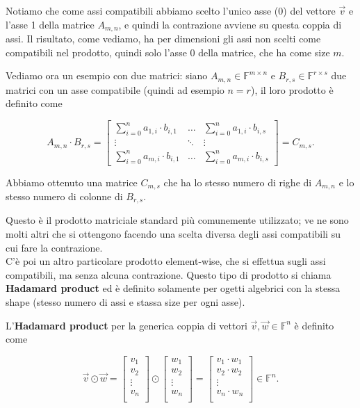 Notiamo che come assi compatibili abbiamo scelto l'unico asse (0) del vettore $\vec v$ e l'asse 1 della matrice $A_{m,n}$, e quindi la contrazione avviene su questa coppia di assi.
Il risultato, come vediamo, ha per dimensioni gli assi non scelti come compatibili nel prodotto, quindi solo l'asse 0 della matrice, che ha come size $m$.

Vediamo ora un esempio con due matrici: siano $A_{m,n} \in \mathbb{F}^{m \times n}$ e $B_{r,s} \in \mathbb{F}^{r \times s}$ due matrici con un asse compatibile (quindi ad esempio $n=r$), il loro prodotto è definito come

$$
A_{m,n} \cdot B_{r,s} = \begin{bmatrix}
    \sum_{i=0}^n a_{1,i} \cdot b_{i,1} & \dots & \sum_{i=0}^n a_{1,i} \cdot b_{i,s}\\
    \vdots & \ddots & \vdots\\
    \sum_{i=0}^n a_{m,i} \cdot b_{i,1} & \dots & \sum_{i=0}^n a_{m,i} \cdot b_{i,s}
\end{bmatrix} = C_{m,s}.
$$


Abbiamo ottenuto una matrice $C_{m,s}$ che ha lo stesso numero di righe di $A_{m,n}$ e lo stesso numero di colonne di $B_{r, s}$.

Questo è il prodotto matriciale standard più comunemente utilizzato; ve ne sono molti altri che si ottengono facendo una scelta diversa degli assi compatibili su cui fare la contrazione.
\\


C'è poi un altro particolare prodotto element-wise, che si effettua sugli assi compatibili, ma senza alcuna contrazione. Questo tipo di prodotto si chiama \textbf{Hadamard product} ed è definito solamente per ogetti algebrici con la stessa shape (stesso numero di assi e stassa size per ogni asse).

L'\textbf{Hadamard product} per la generica coppia di vettori $\vec v, \vec w \in \mathbb F^n$ è definito come

$$
\vec v \odot \vec w = \begin{bmatrix}
        v_1\\
        v_2\\
        \vdots \\
        v_n \\
\end{bmatrix} \odot \begin{bmatrix}
        w_1\\
        w_2\\
        \vdots \\
        w_n \\
\end{bmatrix} = \begin{bmatrix}
        v_1 \cdot w_1\\
        v_2 \cdot w_2\\
        \vdots \\
        v_n \cdot w_n\\
\end{bmatrix} \in \mathbb F^{n}.
$$

